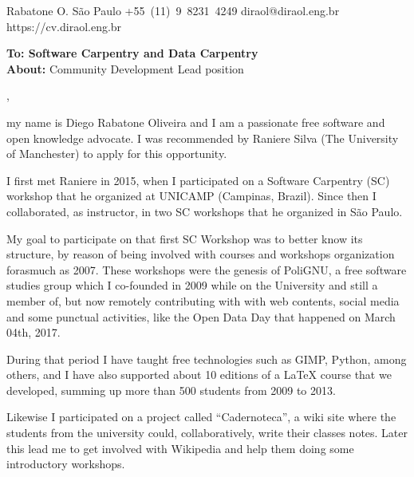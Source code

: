 \documentclass[11pt]{friggeri-cover-letter}
\begin{document}
\thispagestyle{empty}
%
%
       {Rabatone O.}
       {}
       {São Paulo}
       {}
       {+55~(11)~9~8231~4249}
       {diraol@diraol.eng.br}
       {https://cv.diraol.eng.br}

\textbf{To: Software Carpentry and Data Carpentry}\\
\textbf{About:} Community Development Lead position\\

\vfill

,

\vfill

my name is Diego Rabatone Oliveira and I am a passionate free software and open
knowledge advocate. I was recommended by Raniere Silva (The University of
Manchester) to apply for this opportunity.

\vfill

I first met Raniere in 2015, when I participated on a Software Carpentry (SC)
workshop that he organized at UNICAMP (Campinas, Brazil). Since then I
collaborated, as instructor, in two SC workshops that he organized in São
Paulo.

\vfill

My goal to participate on that first SC Workshop was to better know its
structure, by reason of being involved with courses and workshops organization
forasmuch as 2007. These workshops were the genesis of PoliGNU, a free software
studies group which I co-founded in 2009 while on the University \- and still a
member of, but now remotely contributing with with web contents, social media
and some punctual activities, like the Open Data Day that happened on March
04th, 2017.

\vfill

During that period I have taught free technologies such as GIMP, Python, among
others, and I have also supported about 10 editions of a LaTeX course that we
developed, summing up more than 500 students from 2009 to 2013.

\vfill

Likewise I participated on a project called ``Cadernoteca'', a wiki site where
the students from the university could, collaboratively, write their classes
notes. Later this lead me to get involved with Wikipedia and help them doing
some introductory workshops.
\end{document}
